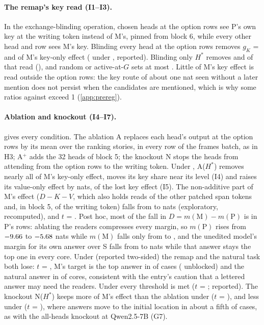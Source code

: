 \paragraph{The remap's key read (I1--I3).} In the exchange-blinding operation, chosen heads at the option rows see P's own key at the writing token instead of M's, pinned from block 6, while every other head and row sees M's key. Blinding every head at the option rows removes $g_K$ = \IoneGOpt{} and \IoneGLetter{} of M's key-only effect (\IoneGPost{} under \fmtPost{}, reported). Blinding only $H^*$ removes \ItwoKOOpt{} and \ItwoKOLetter{} of that read (\ItwoKOPost{}), and random or active-at-$G$ sets at most \IthreeMax{}. Little of M's key effect is read outside the option rows: the key route of about one nat seen without a later mention does not persist when the candidates are mentioned, which is why some ratios against \fmtNone{} exceed 1 (\cref{app:prereg}).

\paragraph{Ablation and knockout (I4--I7).}  gives every condition. The ablation A replaces each head's output at the option rows by its mean over the ranking stories, in every row of the frames batch, as in H3; A$^+$ adds the 32 heads of block 5; the knockout N stops the heads from attending from the option rows to the writing token. Under \fmtOpt{}, A($H^*$) removes nearly all of M's key-only effect, moves its key share near its \fmtNone{} level (I4) and raises its value-only effect by \IfiveDV{} nats, \IfiveRatio{} of the lost key effect (I5). The non-additive part of M's effect ($D - K - V$, which also holds reads of the other patched span tokens and, in block 5, of the writing token) falls from \InonAddU{} to \InonAddA{} nats (exploratory, recomputed), and $t$ = \IsixT{}. Post hoc, most of the fall in $D = m(\mathrm{M}) - m(\mathrm{P})$ is in P's rows: ablating the readers compresses every margin, so $m(\mathrm{P})$ rises from $-9.66$ to $-5.68$ nats while $m(\mathrm{M})$ falls only from \ImMU{} to \ImMA{}, and the unedited model's margin for its own answer over S falls from \IbMarginU{} to \IbMarginA{} nats while that answer stays the top one in every core. Under \fmtLetter{} (reported two-sided) the remap and the natural task both lose: $t$ = \IsixTLetter{}, M's target is the top answer in \IsixMTALetter{} of cases (\IsixMTLetter{} unblocked) and the natural answer in \IsixBBALetter{} of cores, consistent with the entry's caution that a lettered answer may need the readers. Under \fmtPost{} every threshold is met ($t$ = \IsixTPost{}; reported). The knockout N($H^*$) keeps more of M's effect than the ablation under \fmtOpt{} ($t$ = \InTOpt{}), and less under \fmtLetter{} ($t$ = \InTLetter{}), where answers move to the initial location in about a fifth of cases, as with the all-heads knockout at Qwen2.5-7B (G7).

